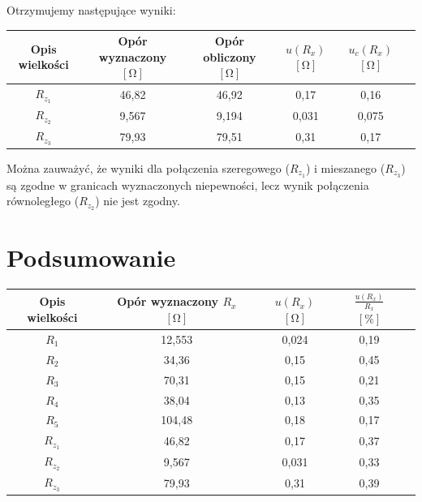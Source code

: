 \documentclass [a4paper,11pt]{article}
\begin{document}
\begin{enumerate}[label=\alph*)]
		Otrzymujemy następujące wyniki:
		\begin{center}
			\begin{tabular}{|c|c|c|c|c|c|}
				\hline Opis wielkości & Opór wyznaczony $[\mathrm{\Omega}]$ & Opór obliczony $[\mathrm{\Omega}]$ & $u(R_x)$ $[\mathrm{\Omega}]$ & $u_c(R_x)$ $[\mathrm{\Omega}]$ \\
				\hline $R_{z_1}$ & 46,82 & 46,92 & 0,17 & 0,16  \\
				\hline $R_{z_2}$ & 9,567 & 9,194 & 0,031 & 0,075  \\  
				\hline $R_{z_3}$ & 79,93 & 79,51  & 0,31 &  0,17 \\ 
				\hline 
			\end{tabular} 
		\end{center}
		Można zauważyć, że wyniki dla połączenia szeregowego ($R_{z_1}$) i mieszanego ($R_{z_3}$) są zgodne w granicach wyznaczonych niepewności, lecz wynik połączenia równoległego ($R_{z_2}$) nie jest zgodny.
	
	\end{enumerate}
	
	\section{Podsumowanie}
	\begin{center}
		\begin{tabular}{|c|c|c|c|c|}
			\hline Opis wielkości & Opór wyznaczony $R_x$ $[\mathrm{\Omega}]$ & $u(R_x)$ $[\mathrm{\Omega}]$ &  $ \frac{u(R_x)}{R_x} $ $[\%]$ \\
			\hline $R_1$ & 12,553 & 0,024 & 0,19  \\
			\hline $R_2$ & 34,36 & 0,15 & 0,45  \\
			\hline $R_3$ & 70,31 & 0,15 & 0,21  \\
			\hline $R_4$ & 38,04 & 0,13 & 0,35  \\
			\hline $R_5$ & 104,48 & 0,18 & 0,17  \\
			\hline $R_{z_1}$ & 46,82 & 0,17 & 0,37  \\
			\hline $R_{z_2}$ & 9,567 & 0,031 & 0,33  \\  
			\hline $R_{z_3}$ & 79,93 & 0,31 & 0,39  \\ 
			\hline 
		\end{tabular} 
	\end{center}
\vspace{1em}
\end{document}
